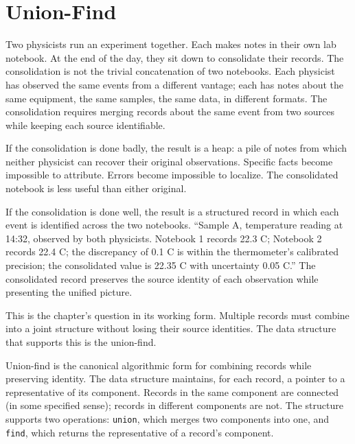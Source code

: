 \chapter{Union-Find}
\label{chap:union-find}


\begin{chapteressay}

Two physicists run an experiment together. Each makes notes in their
own lab notebook. At the end of the day, they sit down to consolidate
their records. The consolidation is not the trivial concatenation of
two notebooks. Each physicist has observed the same events from a
different vantage; each has notes about the same equipment, the same
samples, the same data, in different formats. The consolidation
requires merging records about the same event from two sources while
keeping each source identifiable.

If the consolidation is done badly, the result is a heap: a pile of
notes from which neither physicist can recover their original
observations. Specific facts become impossible to attribute. Errors
become impossible to localize. The consolidated notebook is less
useful than either original.

If the consolidation is done well, the result is a structured record
in which each event is identified across the two notebooks. ``Sample
A, temperature reading at 14:32, observed by both physicists. Notebook
1 records 22.3 C; Notebook 2 records 22.4 C; the discrepancy of 0.1 C
is within the thermometer's calibrated precision; the consolidated
value is 22.35 C with uncertainty 0.05 C.'' The consolidated record
preserves the source identity of each observation while presenting the
unified picture.

This is the chapter's question in its working form. Multiple records
must combine into a joint structure without losing their source
identities. The data structure that supports this is the union-find.

Union-find is the canonical algorithmic form for combining records
while preserving identity. The data structure maintains, for each
record, a pointer to a representative of its component. Records in
the same component are connected (in some specified sense); records
in different components are not. The structure supports two operations:
\texttt{union}, which merges two components into one, and \texttt{find},
which returns the representative of a record's component.


\end{chapteressay}
